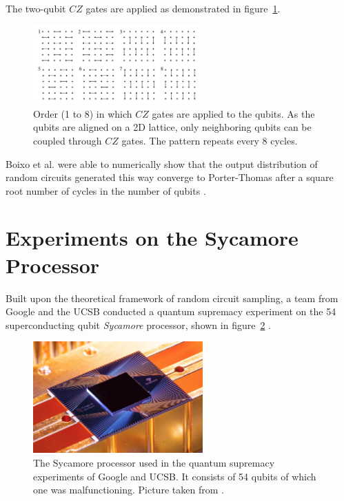 The two-qubit $CZ$ gates are applied as demonstrated in figure~\ref{fig:czgates}.

\begin{figure}[H]
  \centering
  \includegraphics[width=0.58\textwidth]{figures/cz_order}
  \caption[Order of $CZ$ Gate Applications in Random Circuits]{Order (1 to 8) in which $CZ$ gates are applied to the qubits. As 
  the qubits are aligned on a 2D lattice, only neighboring qubits can be coupled through $CZ$ gates. 
  The pattern repeats every 8 cycles.}
  \label{fig:czgates}
\end{figure}

Boixo et al. were able to numerically show that the output distribution of random circuits generated this way
converge to Porter-Thomas after a square root
number of cycles in the number of qubits \cite{Boixo2018supremacy}.

\section{Experiments on the Sycamore Processor}
\label{sec:experiments_sycamore}

Built upon the theoretical framework of random circuit sampling,
a team from Google and the UCSB conducted a quantum
supremacy experiment on the 54 superconducting qubit \textit{Sycamore}
processor, shown in figure~\ref{fig:sycamore} \cite{martines2019supremacy}.

\begin{figure}[H]
  \centering
  \includegraphics[width=0.58\textwidth]{figures/sycamore}
  \caption[The Sycamore processor]{The Sycamore processor used in the quantum supremacy experiments of Google and UCSB. It consists of 54 qubits of which one was malfunctioning. Picture taken from \cite{martines2019supremacy}.}
  \label{fig:sycamore}
\end{figure}


